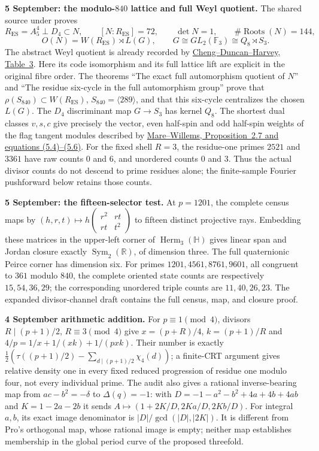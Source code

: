 \documentclass[10pt,letterpaper]{article}
\begin{document}
\noindent\textbf{5 September: the modulo-$840$ lattice and full Weyl quotient.}
The shared source  under
 proves
\[
 R_{\mathrm{ES}}=A_5^4\perp D_4\subset N,\qquad
 [N:R_{\mathrm{ES}}]=72,\qquad \det N=1,
 \qquad \#\operatorname{Roots}(N)=144,
\]
\[
 O(N)=W(R_{\mathrm{ES}})\rtimes L(G),\qquad
 G\cong GL_2(\mathbb F_3)\cong Q_8\rtimes S_3.
\]
The abstract Weyl quotient is already recorded by
\href{https://arxiv.org/abs/1307.5793}{Cheng--Duncan--Harvey, Table~3}.
Here its code isomorphism and its full lattice lift are explicit in the
original fibre order. The theorems ``The exact full automorphism quotient
of $N$'' and ``The residue six-cycle in the full automorphism group''
prove that $\rho(S_{840})\subset W(R_{\mathrm{ES}})$,
$S_{840}=\langle289\rangle$, and that this six-cycle centralizes the
chosen $L(G)$. The $D_4$ discriminant map $G\to S_3$ has kernel $Q_8$.
The shortest dual classes $v,s,c$ give precisely the vector, even
half-spin and odd half-spin weights of the flag tangent modules described
by \href{https://www.uni-muenster.de/FB10/mjm/vol_6/mjm_vol_6_14.pdf}%
{Mare--Willems, Proposition~2.7 and equations (5.4)--(5.6)}.
For the fixed shell $R=3$, the residue-one primes $2521$ and $3361$
have raw counts $0$ and $6$, and unordered counts $0$ and $3$.
Thus the actual divisor counts do not descend to prime residues alone;
the finite-sample Fourier pushforward below retains those counts.

\noindent\textbf{5 September: the fifteen-selector test.}
At $p=1201$, the complete census maps by
$(h,r,t)\mapsto h\left(\begin{smallmatrix}r^2&rt\\rt&t^2\end{smallmatrix}\right)$
to fifteen distinct projective rays. Embedding these matrices in the
upper-left corner of $\operatorname{Herm}_3(\mathbb H)$ gives linear span
and Jordan closure exactly $\operatorname{Sym}_2(\mathbb R)$, of dimension
three. The full quaternionic Peirce corner has dimension six. For primes
$1201,4561,8761,9601$, all congruent to $361$ modulo $840$, the complete
oriented state counts are respectively $15,54,36,29$; the corresponding
unordered triple counts are $11,40,26,23$. The expanded divisor-channel
draft contains the full census, map, and closure proof.

\noindent\textbf{4 September arithmetic addition.}
For $p\equiv1\pmod4$, divisors $R\mid(p+1)/2$, $R\equiv3\pmod4$
give $x=(p+R)/4$, $k=(p+1)/R$ and
$4/p=1/x+1/(xk)+1/(pxk)$. Their number is exactly
$\frac12(\tau((p+1)/2)-\sum_{d\mid(p+1)/2}\chi_4(d))$; a finite-CRT
argument gives relative density one in every fixed reduced progression
of residue one modulo four, not every individual prime. The audit also gives
a rational inverse-bearing map from $ac-b^2=-\delta$ to $\Delta(q)=-1$:
with $D=-1-a^2-b^2+4a+4b+4ab$ and $K=1-2a-2b$ it sends
$A\mapsto(1+2K/D,2Ka/D,2Kb/D)$. For integral $a,b$, its exact image
denominator is $|D|/\gcd(|D|,|2K|)$. It is different from Pro's
orthogonal map, whose rational image is empty; neither map establishes
membership in the global period curve of the proposed threefold.
\end{document}
